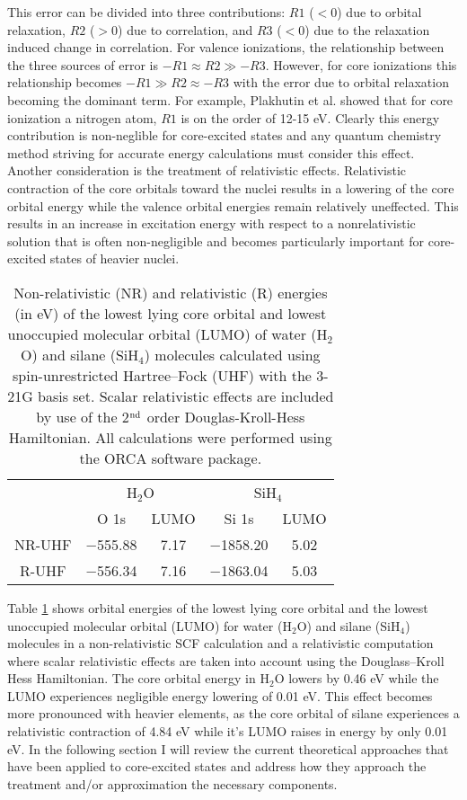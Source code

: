 \documentclass{article}
\begin{document}
This error can be divided into three contributions: $R1$ ($<0$) due to orbital relaxation, $R2$ ($>0$) due to correlation,  and $R3$ ($<0$) due to the relaxation induced change in correlation. For valence ionizations, the relationship between the three sources of error is $-R1 \approx R2 \gg -R3$. However, for core ionizations this relationship becomes $-R1 \gg R2 \approx -R3$ with the error due to orbital relaxation becoming the dominant term. For example, Plakhutin et al. \cite{plakhutin_koopmans_2006} showed that for core ionization a nitrogen atom, $R1$ is on the order of 12-15 eV. \cite{plakhutin_koopmans_2006} Clearly this energy contribution is non-neglible for core-excited states and any quantum chemistry method striving for accurate energy calculations must consider this effect. Another consideration is the treatment of relativistic effects. Relativistic contraction of the core orbitals toward the nuclei results in a lowering of the core orbital energy while the valence orbital energies remain relatively uneffected. This results in an increase in excitation energy with respect to a nonrelativistic solution that is often non-negligible and becomes particularly important for core-excited states of heavier nuclei. 
\begin{table}
\centering
\caption{Non-relativistic (NR) and relativistic (R) energies (in eV) of the lowest lying core orbital and lowest unoccupied molecular orbital (LUMO) of water (H$_2$O) and silane (SiH$_4$) molecules calculated using spin-unrestricted Hartree--Fock (UHF) with the 3-21G basis set. Scalar relativistic effects are included by use of the 2$^{\rm nd}$ order Douglas-Kroll-Hess Hamiltonian.\cite{reiher_douglaskrollhess_2006} All calculations were performed using the ORCA software package.}
\begin{tabular}{ccccc}
\toprule
& \multicolumn{2}{c}{H$_2$O} & \multicolumn{2}{c}{SiH$_4$} \\ \cmidrule(lr){2-3} \cmidrule(lr){4-5}
& O 1s & LUMO & Si 1s & LUMO \\
\hline
NR-UHF & $-$555.88 & 7.17 & $-$1858.20 & 5.02\\
R-UHF & $-$556.34 & 7.16 & $-$1863.04 & 5.03\\
\bottomrule
\end{tabular}
\label{tab:rel_effects}
\end{table}
Table \ref{tab:rel_effects} shows orbital energies of the lowest lying core orbital and the lowest unoccupied molecular orbital (LUMO) for water (H$_2$O) and silane (SiH$_4$) molecules in a non-relativistic SCF calculation and a relativistic computation where scalar relativistic effects are taken into account using the Douglass--Kroll Hess Hamiltonian.\cite{reiher_douglaskrollhess_2006} The core orbital energy in H$_2$O lowers by 0.46 eV while the LUMO experiences negligible energy lowering of 0.01 eV. This effect becomes more pronounced with heavier elements, as the core orbital of silane experiences a relativistic contraction of 4.84 eV while it's LUMO raises in energy by only 0.01 eV. In the following section I will review the current theoretical approaches that have been applied to core-excited states and address how they approach the treatment and/or approximation the necessary components.
\end{document}
